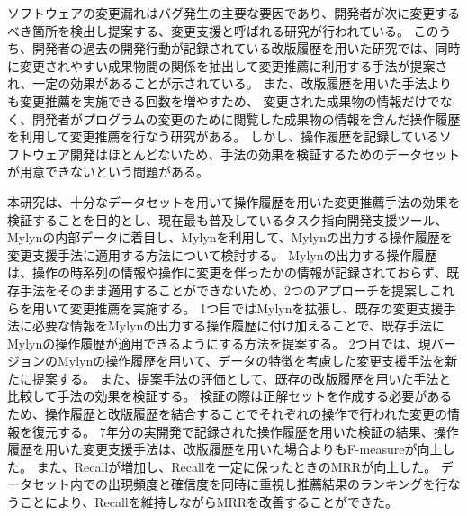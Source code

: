 ソフトウェアの変更漏れはバグ発生の主要な要因であり、開発者が次に変更するべき箇所を検出し提案する、変更支援と呼ばれる研究が行われている。
このうち、開発者の過去の開発行動が記録されている改版履歴を用いた研究では、同時に変更されやすい成果物間の関係を抽出して変更推薦に利用する手法が提案され、一定の効果があることが示されている。
また、改版履歴を用いた手法よりも変更推薦を実施できる回数を増やすため、
変更された成果物の情報だけでなく、開発者がプログラムの変更のために閲覧した成果物の情報を含んだ操作履歴を利用して変更推薦を行なう研究がある。
しかし、操作履歴を記録しているソフトウェア開発はほとんどないため、手法の効果を検証するためのデータセットが用意できないという問題がある。

本研究は、十分なデータセットを用いて操作履歴を用いた変更推薦手法の効果を検証することを目的とし、現在最も普及しているタスク指向開発支援ツール、Mylynの内部データに着目し、Mylynを利用して、Mylynの出力する操作履歴を変更支援手法に適用する方法について検討する。
Mylynの出力する操作履歴は、操作の時系列の情報や操作に変更を伴ったかの情報が記録されておらず、既存手法をそのまま適用することができないため、2つのアプローチを提案しこれらを用いて変更推薦を実施する。
1つ目ではMylynを拡張し、既存の変更支援手法に必要な情報をMylynの出力する操作履歴に付け加えることで、既存手法にMylynの操作履歴が適用できるようにする方法を提案する。
2つ目では、現バージョンのMylynの操作履歴を用いて、データの特徴を考慮した変更支援手法を新たに提案する。
また、提案手法の評価として、既存の改版履歴を用いた手法と比較して手法の効果を検証する。
検証の際は正解セットを作成する必要があるため、操作履歴と改版履歴を結合することでそれぞれの操作で行われた変更の情報を復元する。
7年分の実開発で記録された操作履歴を用いた検証の結果、操作履歴を用いた変更支援手法は、改版履歴を用いた場合よりもF-measureが向上した。
また、Recallが増加し、Recallを一定に保ったときのMRRが向上した。
データセット内での出現頻度と確信度を同時に重視し推薦結果のランキングを行なうことにより、Recallを維持しながらMRRを改善することができた。



